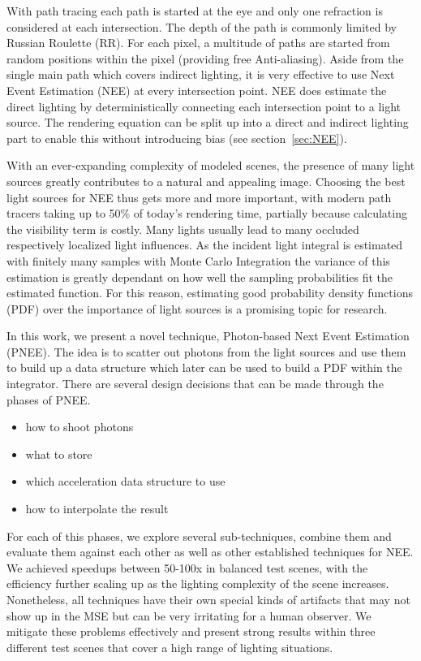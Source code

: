 With path tracing each path is started at the eye and only one refraction is considered at each intersection. The depth of the path is commonly limited by Russian Roulette (RR). For each pixel, a multitude of paths are started from random positions within the pixel (providing free Anti-aliasing). Aside from the single main path which covers indirect lighting, it is very effective to use Next Event Estimation (NEE) at every intersection point. NEE does estimate the direct lighting by deterministically connecting each intersection point to a light source. The rendering equation can be split up into a direct and indirect lighting part to enable this without introducing bias (see section~\ref{sec:NEE}).

With an ever-expanding complexity of modeled scenes, the presence of many light sources greatly contributes to a natural and appealing image. Choosing the best light sources for NEE thus gets more and more important, with modern path tracers taking up to 50\% of today's rendering time, partially because calculating the visibility term is costly. Many lights usually lead to many occluded respectively localized light influences. As the incident light integral is estimated with finitely many samples with Monte Carlo Integration the variance of this estimation is greatly dependant on how well the sampling probabilities fit the estimated function. For this reason, estimating good probability density functions (PDF) over the importance of light sources is a promising topic for research.

In this work, we present a novel technique, Photon-based Next Event Estimation (PNEE). The idea is to scatter out photons from the light sources and use them to build up a data structure which later can be used to build a PDF within the integrator. There are several design decisions that can be made through the phases of PNEE.

\begin{itemize}
    \item how to shoot photons
    \item what to store
    \item which acceleration data structure to use
    \item how to interpolate the result
\end{itemize}

For each of this phases, we explore several sub-techniques, combine them and evaluate them against each other as well as other established techniques for NEE. We achieved speedups between 50-100x in balanced test scenes, with the efficiency further scaling up as the lighting complexity of the scene increases. Nonetheless, all techniques have their own special kinds of artifacts that may not show up in the MSE but can be very irritating for a human observer. We mitigate these problems effectively and present strong results within three different test scenes that cover a high range of lighting situations.

